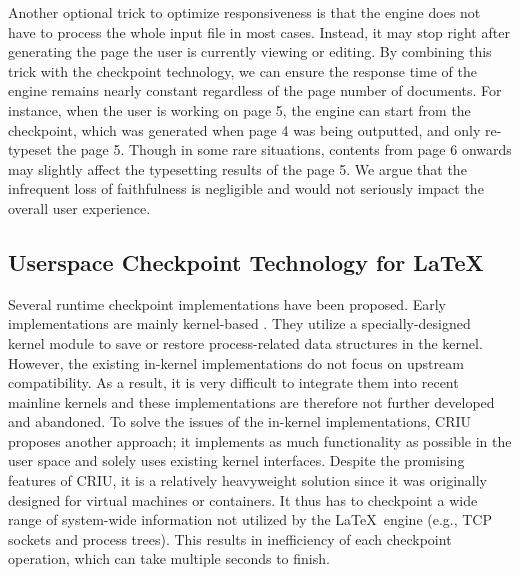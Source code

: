 \documentclass[]{sigchi}
\begin{document}
Another optional trick to optimize responsiveness is that the engine does not have to process the whole input file in most cases. Instead, it may stop right after generating the page the user is currently viewing or editing. By combining this trick with the checkpoint technology, we can ensure the response time of the engine remains nearly constant regardless of the page number of documents. For instance, when the user is working on page 5, the engine can start from the checkpoint, which was generated when page 4 was being outputted, and only re-typeset the page 5. Though in some rare situations, contents from page 6 onwards may slightly affect the typesetting results of the page 5. We argue that the infrequent loss of faithfulness is negligible and would not seriously impact the overall user experience.


\subsection{Userspace Checkpoint Technology for \LaTeX}
Several runtime checkpoint implementations have been proposed. Early implementations are mainly kernel-based \cite{hargrove2006berkeley}. They utilize a specially-designed kernel module to save or restore process-related data structures in the kernel. However, the existing in-kernel implementations do not focus on upstream compatibility. As a result, it is very difficult to integrate them into recent mainline kernels and these implementations are therefore not further developed and abandoned.
To solve the issues of the in-kernel implementations, CRIU \cite{emelyanovcriu} proposes another approach; it implements as much functionality as possible in the user space and solely uses existing kernel interfaces. Despite the promising features of CRIU, it is a relatively heavyweight solution since it was originally designed for virtual machines or containers. It thus has to checkpoint a wide range of system-wide information not utilized by the \LaTeX\ engine (e.g., TCP sockets and process trees). This results in inefficiency of each checkpoint operation, which can take multiple seconds to finish.
\end{document}
